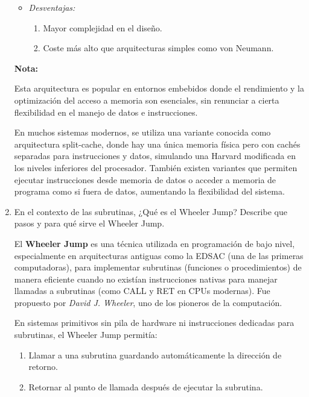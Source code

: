 \documentclass[12pt,letterpaper]{article}
\begin{document}
\begin{enumerate}
\begin{itemize}
  \item \textit{Desventajas:}
    \begin{enumerate}[label=\arabic*)]
    \item Mayor complejidad en el diseño.
    \item Coste más alto que arquitecturas simples como von Neumann.
    \end{enumerate}
  \end{itemize}
  
  \textbf{Nota:}
  
  Esta arquitectura es popular en entornos embebidos donde el rendimiento y la optimización del acceso a memoria son esenciales, sin renunciar a cierta flexibilidad en el manejo de datos e instrucciones.
  
  En muchos sistemas modernos, se utiliza una variante conocida como arquitectura split-cache, donde hay una única memoria física pero con cachés separadas para instrucciones y datos, simulando una Harvard modificada en los niveles inferiores del procesador. También existen variantes que permiten ejecutar instrucciones desde memoria de datos o acceder a memoria de programa como si fuera de datos, aumentando la flexibilidad del sistema.
  
  \bigskip
  
\item En el contexto de las subrutinas, ¿Qué es el Wheeler Jump? Describe que pasos y para qué sirve el Wheeler Jump.

  El \textbf{Wheeler Jump} es una técnica utilizada en programación de bajo nivel, especialmente en arquitecturas antiguas como la EDSAC (una de las primeras computadoras), para implementar subrutinas (funciones o procedimientos) de manera eficiente cuando no existían instrucciones nativas para manejar llamadas a subrutinas (como CALL y RET en CPUs modernas). Fue propuesto por \textit{David J. Wheeler}, uno de los pioneros de la computación.
  
  En sistemas primitivos sin pila de hardware ni instrucciones dedicadas para subrutinas, el Wheeler Jump permitía:

  \begin{enumerate}[label=\alph*)]
  \item Llamar a una subrutina guardando automáticamente la dirección de retorno.
    
  \item Retornar al punto de llamada después de ejecutar la subrutina.
    

\end{enumerate}
\end{enumerate}
\end{document}
